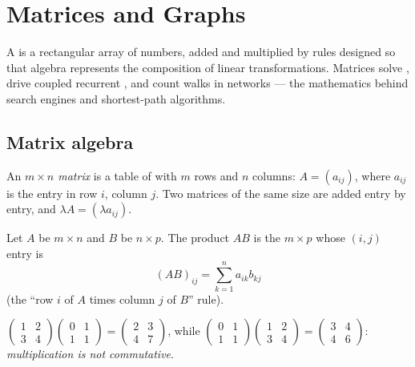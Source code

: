 \chapter{Matrices and Graphs}\label{ch:g12:matrix}

A  is a rectangular array of numbers, added and multiplied by rules
designed so that  algebra represents the composition of linear
transformations. Matrices solve , drive coupled recurrent
, and count walks in networks --- the mathematics behind search
engines and shortest-path algorithms.

\section{Matrix algebra}

\begin{definition}[Matrix]\label{def:g12:matrix:matrix}
An \emph{$m \times n$ matrix} is a table of  with
$m$ rows and $n$ columns:
$A = (a_{ij})$, where $a_{ij}$ is the entry in row $i$, column $j$.
Two matrices of the same size are added entry by entry, and
$\lambda A = (\lambda a_{ij})$.
\end{definition}

\begin{definition}\label{def:g12:matrix:product}
Let $A$ be $m \times n$ and $B$ be $n \times p$. The product $AB$ is the
$m \times p$  whose $(i,j)$ entry is
\[
(AB)_{ij} = \sum_{k=1}^{n} a_{ik} b_{kj}
\]
(the ``row $i$ of $A$ times column $j$ of $B$'' rule).
\end{definition}

\begin{example}
$\begin{pmatrix} 1 & 2\\ 3 & 4\end{pmatrix}
\begin{pmatrix} 0 & 1\\ 1 & 1\end{pmatrix}
= \begin{pmatrix} 2 & 3\\ 4 & 7\end{pmatrix}$,
\quad while \quad
$\begin{pmatrix} 0 & 1\\ 1 & 1\end{pmatrix}
\begin{pmatrix} 1 & 2\\ 3 & 4\end{pmatrix}
= \begin{pmatrix} 3 & 4\\ 4 & 6\end{pmatrix}$:
\emph{ multiplication is not commutative}.
\end{example}

